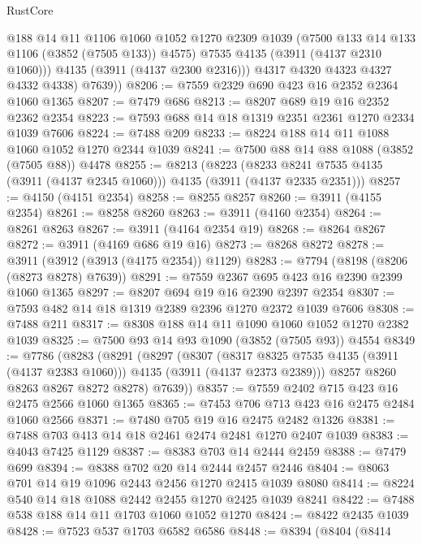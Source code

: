 \begin{lexlean}{RustCore}
\begin{coremodule}
              @188
              @14
              @11
              @1106
              @1060
              @1052
              @1270
              @2309
              @1039
              (@7500 @133 @14 @133 @1106 (@3852 (@7505 @133)) @4575)
              @7535
              @4135
              (@3911 (@4137 @2310 @1060)))
            @4135
            (@3911 (@4137 @2300 @2316)))
          @4317
          @4320
          @4323
          @4327
          @4332
          @4338)
        @7639))
@8206 := @7559 @2329 @690 @423 @16 @2352 @2364 @1060 @1365
@8207 := @7479 @686
@8213 := @8207 @689 @19 @16 @2352 @2362 @2354
@8223 := @7593 @688 @14 @18 @1319 @2351 @2361 @1270 @2334 @1039 @7606
@8224 := @7488 @209
@8233 := @8224 @188 @14 @11 @1088 @1060 @1052 @1270 @2344 @1039
@8241 := @7500 @88 @14 @88 @1088 (@3852 (@7505 @88)) @4478
@8255 := @8213
    (@8223 (@8233 @8241 @7535 @4135 (@3911 (@4137 @2345 @1060))) @4135 (@3911 (@4137 @2335 @2351)))
@8257 := @4150 (@4151 @2354)
@8258 := @8255 @8257
@8260 := @3911 (@4155 @2354)
@8261 := @8258 @8260
@8263 := @3911 (@4160 @2354)
@8264 := @8261 @8263
@8267 := @3911 (@4164 @2354 @19)
@8268 := @8264 @8267
@8272 := @3911 (@4169 @686 @19 @16)
@8273 := @8268 @8272
@8278 := @3911 (@3912 (@3913 (@4175 @2354)) @1129)
@8283 := @7794 (@8198 (@8206 (@8273 @8278) @7639))
@8291 := @7559 @2367 @695 @423 @16 @2390 @2399 @1060 @1365
@8297 := @8207 @694 @19 @16 @2390 @2397 @2354
@8307 := @7593 @482 @14 @18 @1319 @2389 @2396 @1270 @2372 @1039 @7606
@8308 := @7488 @211
@8317 := @8308 @188 @14 @11 @1090 @1060 @1052 @1270 @2382 @1039
@8325 := @7500 @93 @14 @93 @1090 (@3852 (@7505 @93)) @4554
@8349 := @7786
    (@8283
      (@8291
        (@8297
          (@8307
            (@8317 @8325 @7535 @4135 (@3911 (@4137 @2383 @1060)))
            @4135
            (@3911 (@4137 @2373 @2389)))
          @8257
          @8260
          @8263
          @8267
          @8272
          @8278)
        @7639))
@8357 := @7559 @2402 @715 @423 @16 @2475 @2566 @1060 @1365
@8365 := @7453 @706 @713 @423 @16 @2475 @2484 @1060 @2566
@8371 := @7480 @705 @19 @16 @2475 @2482 @1326
@8381 := @7488 @703 @413 @14 @18 @2461 @2474 @2481 @1270 @2407 @1039
@8383 := @4043 @7425 @1129
@8387 := @8383 @703 @14 @2444 @2459
@8388 := @7479 @699
@8394 := @8388 @702 @20 @14 @2444 @2457 @2446
@8404 := @8063 @701 @14 @19 @1096 @2443 @2456 @1270 @2415 @1039 @8080
@8414 := @8224 @540 @14 @18 @1088 @2442 @2455 @1270 @2425 @1039 @8241
@8422 := @7488 @538 @188 @14 @11 @1703 @1060 @1052 @1270
@8424 := @8422 @2435 @1039
@8428 := @7523 @537 @1703 @6582 @6586
@8448 := @8394
    (@8404
      (@8414

\end{coremodule}
\end{lexlean}
